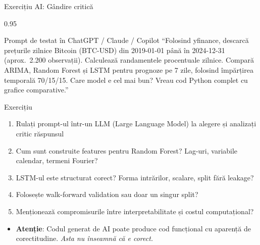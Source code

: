 \documentclass[9pt, aspectratio=169, t]{beamer}
\begin{document}
\begin{frame}{Exercițiu AI: Gândire critică}
    \begin{cminipage}{0.95\textwidth}
        \vspace{-3mm}
        \begin{block}{\footnotesize Prompt de testat în ChatGPT / Claude / Copilot}
            {\footnotesize
            ``Folosind yfinance, descarcă prețurile zilnice Bitcoin (BTC-USD) din 2019-01-01 până în 2024-12-31 (aprox.\ 2.200 observații). Calculează randamentele procentuale zilnice. Compară ARIMA, Random Forest și LSTM pentru prognoze pe 7 zile, folosind împărțirea temporală 70/15/15. Care model e cel mai bun? Vreau cod Python complet cu grafice comparative.''
            }
        \end{block}
        \vspace{-2mm}
        {\footnotesize
        \begin{block}{Exercițiu}
            \begin{enumerate}\setlength{\itemsep}{0pt}
                \item Rulați prompt-ul într-un LLM (Large Language Model) la alegere și analizați critic răspunsul
                \item Cum sunt construite features pentru Random Forest? Lag-uri, variabile calendar, termeni Fourier?
                \item LSTM-ul este structurat corect? Forma intrărilor, scalare, split fără leakage?
                \item Folosește walk-forward validation sau doar un singur split?
                \item Menționează compromisurile între interpretabilitate și costul computațional?
            \end{enumerate}
        \end{block}
        }
        \vspace{-2mm}
        \begin{alertblock}{}
            \begin{itemize}\setlength{\itemsep}{0pt}
                \item \textbf{Atenție}: Codul generat de AI poate produce cod funcțional cu aparență de corectitudine. \textit{Asta nu înseamnă că e corect.}
            \end{itemize}
        \end{alertblock}
    \end{cminipage}
\end{frame}
\end{document}
